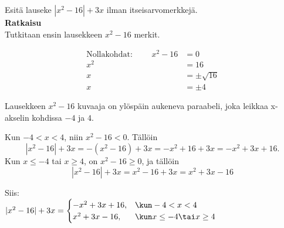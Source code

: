 \begin{esimerkki}
	Esitä lauseke $|x^2-16|+3x$ ilman itseisarvomerkkejä.\\
	\textbf{Ratkaisu} \\
	Tutkitaan ensin lausekkeen $x^2-16$ merkit.
	
	\begin{align*}
		\text{Nollakohdat: } \qquad	x^2-16 &=0 \\
			x^2 &=16 \\
			x &=\pm\sqrt{16} \\
			x &=\pm 4
	\end{align*}
	
	Lausekkeen $x^2-16$ kuvaaja on ylöspäin aukeneva paraabeli, joka leikkaa x-akselin kohdissa $-4$ ja $4$.
	
% 
%


\begin{lukusuora}{-10}{10}{8}
\end{lukusuora}

Kun $-4<x<4$, niin $x^2-16<0$. Tällöin
\[
|x^2-16|+3x = -(x^2-16)+3x = -x^2+16+3x=-x^2+3x+16.
\]
Kun $x\leq-4$ tai $x\geq4$, on $x^2-16\geq0$, ja tällöin
\[
|x^2-16|+3x =x^2-16+3x=x^2+3x-16
\]

Siis:\\

			$|x^2-16|+3x=
			\begin{cases}
				-x^2+3x+16, & \kun -4<x<4 \\
				x^2+3x-16, & \kun x\leq -4 \tai x\geq 4
			\end{cases}$

\end{esimerkki}

